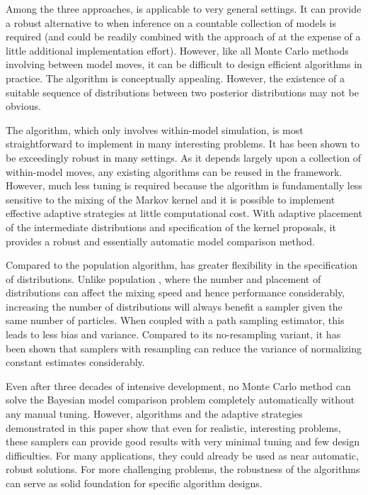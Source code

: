 Among the three approaches, \smc[1] is applicable to very general settings. It
can provide a robust alternative to \rjmcmc when inference on a countable
collection of models is required (and could be readily combined with the
approach of \cite{Jasra:2008bb} at the expense of a little additional
implementation effort). However, like all Monte Carlo methods involving
between model moves, it can be difficult to design efficient algorithms in
practice. The \smc[3] algorithm is conceptually appealing. However, the
existence of a suitable sequence of distributions between two posterior
distributions may not be obvious.

The \smc[2] algorithm, which only involves within-model simulation, is most
straightforward to implement in many interesting problems. It has been shown
to be exceedingly robust in many settings. As it depends largely upon a
collection of within-model \mcmc moves, any existing \mcmc algorithms can be
reused in the \smc[2] framework. However, much less tuning is required because
the algorithm is fundamentally less sensitive to the mixing of the Markov
kernel and it is possible to implement effective adaptive strategies at little
computational cost. With adaptive placement of the intermediate distributions
and specification of the \mcmc kernel proposals, it provides a robust and
essentially automatic model comparison method.

Compared to the population \mcmc algorithm, \smc[2] has greater flexibility in
the specification of distributions. Unlike population \mcmc, where the number
and placement of distributions can affect the mixing speed and hence
performance considerably, increasing the number of distributions will always
benefit a \smc sampler given the same number of particles. When coupled with a
path sampling estimator, this leads to less bias and variance. Compared to its
no-resampling variant, it has been shown that \smc samplers with resampling
can reduce the variance of normalizing constant estimates considerably.

Even after three decades of intensive development, no Monte Carlo method can
solve the Bayesian model comparison problem completely automatically without
any manual tuning. However, \smc algorithms and the adaptive strategies
demonstrated in this paper show that even for realistic, interesting problems,
these samplers can provide good results with very minimal tuning and few
design difficulties. For many applications, they could already be used as near
automatic, robust solutions. For more challenging problems, the robustness of
the algorithms can serve as solid foundation for specific algorithm designs.
